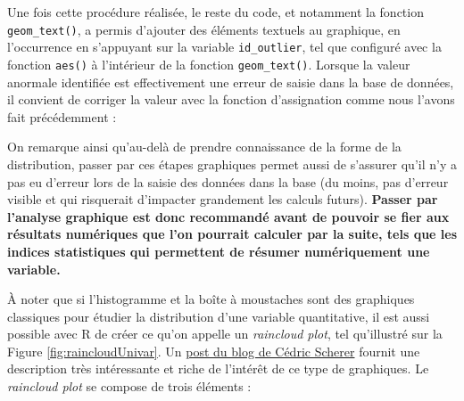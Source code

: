 \documentclass[
  french,
]{book}
\newenvironment{Shaded}{\begin{snugshade}}{\end{snugshade}}
\newcommand{\CommentTok}[1]{\textcolor[rgb]{0.56,0.35,0.01}{\textit{#1}}}
\newcommand{\DecValTok}[1]{\textcolor[rgb]{0.00,0.00,0.81}{#1}}
\newcommand{\FloatTok}[1]{\textcolor[rgb]{0.00,0.00,0.81}{#1}}
\newcommand{\NormalTok}[1]{#1}
\newcommand{\OperatorTok}[1]{\textcolor[rgb]{0.81,0.36,0.00}{\textbf{#1}}}
\newcommand{\StringTok}[1]{\textcolor[rgb]{0.31,0.60,0.02}{#1}}
\begin{document}
Une fois cette procédure réalisée, le reste du code, et notamment la fonction \texttt{geom\_text()}, a permis d'ajouter des éléments textuels au graphique, en l'occurrence en s'appuyant sur la variable \texttt{id\_outlier}, tel que configuré avec la fonction \texttt{aes()} à l'intérieur de la fonction \texttt{geom\_text()}. Lorsque la valeur anormale identifiée est effectivement une erreur de saisie dans la base de données, il convient de corriger la valeur avec la fonction d'assignation comme nous l'avons fait précédemment :

\begin{Shaded}
\end{Shaded}

On remarque ainsi qu'au-delà de prendre connaissance de la forme de la distribution, passer par ces étapes graphiques permet aussi de s'assurer qu'il n'y a pas eu d'erreur lors de la saisie des données dans la base (du moins, pas d'erreur visible et qui risquerait d'impacter grandement les calculs futurs). \textbf{Passer par l'analyse graphique est donc recommandé avant de pouvoir se fier aux résultats numériques que l'on pourrait calculer par la suite, tels que les indices statistiques qui permettent de résumer numériquement une variable.}

À noter que si l'histogramme et la boîte à moustaches sont des graphiques classiques pour étudier la distribution d'une variable quantitative, il est aussi possible avec R de créer ce qu'on appelle un \emph{raincloud plot}, tel qu'illustré sur la Figure \ref{fig:raincloudUnivar}. Un \href{https://www.cedricscherer.com/2021/06/06/visualizing-distributions-with-raincloud-plots-and-how-to-create-them-with-ggplot2/}{post du blog de Cédric Scherer} fournit une description très intéressante et riche de l'intérêt de ce type de graphiques. Le \emph{raincloud plot} se compose de trois éléments :
\end{document}
